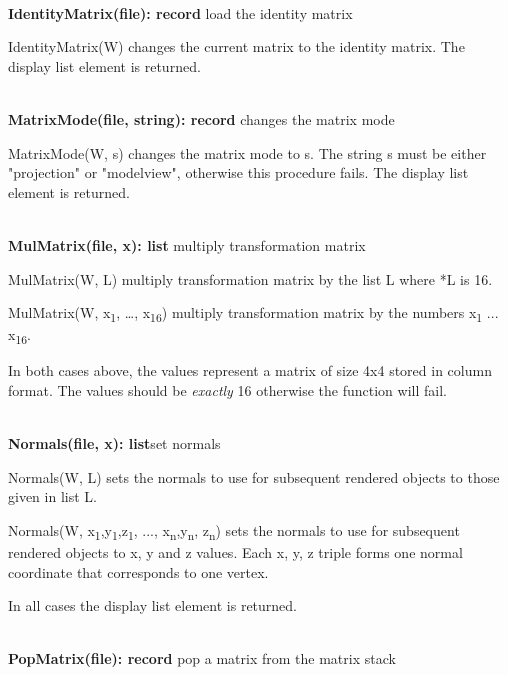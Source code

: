 \documentclass[letterpaper]{article}
\begin{document}
{\noindent\hrulefill\\
\noindent\textsf{\textbf{IdentityMatrix(file): record}}
\hfill load the identity matrix


\bigskip

\textsf{IdentityMatrix(W)} changes the current matrix to the identity
matrix. The display list element is returned.


\bigskip

\noindent\hrulefill\\
\noindent\textsf{\textbf{MatrixMode(file, string): record}}
\hfill changes the matrix mode


\bigskip

\textsf{MatrixMode(W, s)} changes the matrix mode to s. The string s
must be either \textsf{"projection"} or \textsf{"modelview"},
otherwise this procedure fails. The display list element is returned.


\bigskip

\noindent\hrulefill\\
\noindent\textsf{\textbf{MulMatrix(file, x): list}}
\hfill multiply transformation matrix


\bigskip

\textsf{MulMatrix(W, L)} multiply transformation matrix by the list L
where *L is 16.

\textsf{MulMatrix(W, x\textsubscript{1}, {\dots}, x\textsubscript{16})} multiply
transformation matrix by the numbers x\textsubscript{1} ... x\textsubscript{16}.

In both cases above, the values represent a matrix of size 4x4 stored
in column format. The values should be {\em exactly\/} 16
otherwise the function will fail.

\noindent\hrulefill\\
\noindent\textsf{\textbf{Normals(file, x): list}}\hfill set normals

\textsf{Normals(W, L)} sets the normals to use for subsequent
rendered objects to those given in list L.

\textsf{Normals(W, x\textsubscript{1},y\textsubscript{1},z\textsubscript{1}, ..., x\textsubscript{n},y\textsubscript{n}, z\textsubscript{n})}
sets the normals to use for subsequent rendered objects to x, y and z
values. Each x, y, z triple forms one normal coordinate that corresponds
to one vertex.

In all cases the display list element is returned.

\noindent\hrulefill\\
\noindent\textsf{\textbf{PopMatrix(file): record}}
\hfill pop a matrix from the matrix stack


}
\end{document}
